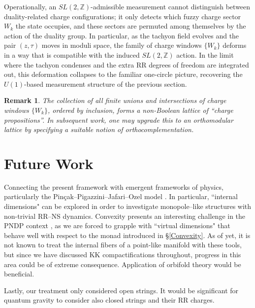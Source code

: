 \documentclass{article}
\newtheorem{rk}{Remark}
\numberwithin{tm}{section}
\numberwithin{dn}{section}
\numberwithin{as}{section}
\numberwithin{rk}{section}
\numberwithin{lem}{section}
\numberwithin{ax}{section}
\numberwithin{pp}{section}
\numberwithin{eg}{section}
\numberwithin{war}{section}
\numberwithin{equation}{section}
\numberwithin{prop}{section}
\numberwithin{nt}{section}
\numberwithin{rc}{section}
\numberwithin{setup}{section}
\begin{document}
	Operationally, an $SL(2,\mathbb{Z})$-admissible measurement cannot distinguish between duality-related charge configurations; it only detects which fuzzy charge sector $W_k$ the state occupies, and these sectors are permuted among themselves by the action of the duality group. In particular, as the tachyon field evolves and the pair $(z,\tau)$ moves in moduli space, the family of charge windows $\{W_k\}$ deforms in a way that is compatible with the induced $SL(2,\mathbb{Z})$ action. In the limit where the tachyon condenses and the extra RR degrees of freedom are integrated out, this deformation collapses to the familiar one-circle picture, recovering the $U(1)$-based measurement structure of the previous section.
	
	\begin{rk}
		The collection of all finite unions and intersections of charge windows $\{W_k\}$, ordered by inclusion, forms a non-Boolean lattice of ``charge propositions''. In subsequent work, one may upgrade this to an orthomodular lattice by specifying a suitable notion of orthocomplementation.
	\end{rk}
	
	\section{Future Work}
	Connecting the present framework with emergent frameworks of physics, particularly the Pinçak--Pigazzini--Jafari--Ozel model \cite{Pincak}. In particular, ``internal dimensions" \cite{Pigazzini, Anchordoqui} can be explored in order to investigate monopole--like structures with non-trivial RR--NS dynamics. Convexity presents an interesting challenge in the PNDP context \cite{Pigazzini}, as we are forced to grapple with ``virtual dimensions" that behave well with respect to the monad introduced in \S\ref{Convexity}. As of yet, it is not known to treat the internal fibers of a point-like manifold with these tools, but since we have discussed KK compactifications throughout, progress in this area could be of extreme consequence. Application of orbifold theory would be beneficial.
	
	Lastly, our treatment only considered open strings. It would be significant for quantum gravity to consider also closed strings and their RR charges. 
	
\end{document}
